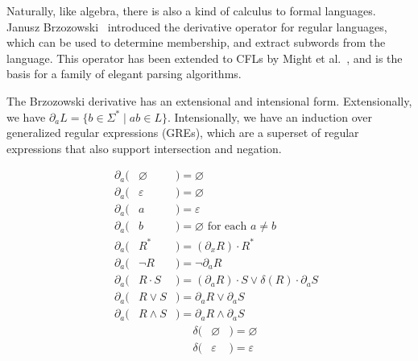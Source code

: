 Naturally, like algebra, there is also a kind of calculus to formal languages. Janusz Brzozowski~\cite{brzozowski1964derivatives} introduced the derivative operator for regular languages, which can be used to determine membership, and extract subwords from the language. This operator has been extended to CFLs by Might et al.~\cite{might2011parsing}, and is the basis for a family of elegant parsing algorithms.

The Brzozowski derivative has an extensional and intensional form. Extensionally, we have $\partial_a L = \{b \in \Sigma^* \mid ab \in L\}$. Intensionally, we have an induction over generalized regular expressions (GREs), which are a superset of regular expressions that also support intersection and negation.\vspace{-1cm}

\begin{multicols}{2}
  \begin{eqnarray*}
    \phantom{-}\partial_a( & \varnothing & )= \varnothing                                           \\
    \phantom{-}\partial_a( & \varepsilon & )= \varnothing                                           \\
    \phantom{-}\partial_a( & a           & )= \varepsilon                                           \\
    \phantom{-}\partial_a( & b           & )= \varnothing  \text{ for each } a \neq b               \\
    \phantom{-}\partial_a( & R^*         & )= (\partial_x R)\cdot R^*                               \\
    \phantom{-}\partial_a( & \neg R      & )= \neg \partial_a R                                     \\
    \phantom{-}\partial_a( & R\cdot S    & )= (\partial_a R)\cdot S \vee \delta(R)\cdot\partial_a S \\
    \phantom{-}\partial_a( & R\vee S     & )= \partial_a R \vee \partial_a S                        \\
    \phantom{-}\partial_a( & R\land S    & )= \partial_a R \land \partial_a S
  \end{eqnarray*} \break\vspace{-0.5cm}
  \begin{eqnarray*}
    \phantom{---}\delta(& \varnothing &)= \varnothing                                      \\
    \phantom{---}\delta(& \varepsilon &)= \varepsilon                                      \\

\end{eqnarray*}
\end{multicols}

